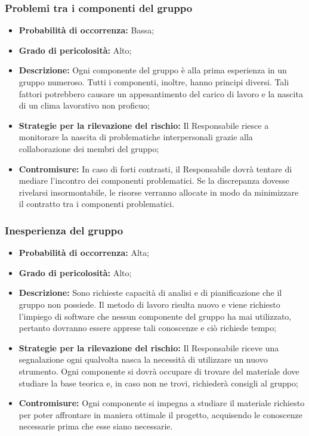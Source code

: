 		\subsubsection{Problemi tra i componenti del gruppo}
		\begin{itemize}
			\item \textbf{Probabilità di occorrenza:} Bassa; \\
			\item \textbf{Grado di pericolosità:} Alto; \\
			\item \textbf{Descrizione:} Ogni componente del gruppo è alla prima esperienza in un gruppo numeroso. Tutti i componenti, inoltre, hanno principi diversi. Tali fattori potrebbero causare un appesantimento del carico di lavoro e la nascita di un clima lavorativo non proficuo; \\
			\item \textbf{Strategie per la rilevazione del rischio:} Il Responsabile riesce a monitorare la nascita di problematiche interpersonali grazie alla collaborazione dei membri del gruppo; \\
			\item \textbf{Contromisure:} In caso di forti contrasti, il Responsabile dovrà tentare di mediare l'incontro dei componenti problematici. Se la discrepanza dovesse rivelarsi insormontabile, le risorse verranno allocate in modo da minimizzare il contratto tra i componenti problematici. \\
		\end{itemize}
		\subsubsection{Inesperienza del gruppo}
		\begin{itemize}
			\item \textbf{Probabilità di occorrenza:} Alta; \\
			\item \textbf{Grado di pericolosità:} Alto; \\
			\item \textbf{Descrizione:} Sono richieste capacità di analisi e di pianificazione che il gruppo non possiede. Il metodo di lavoro risulta nuovo e viene richiesto l'impiego di software che nessun componente del gruppo ha mai utilizzato, pertanto dovranno essere apprese tali conoscenze e ciò richiede tempo; \\
			\item \textbf{Strategie per la rilevazione del rischio:} Il Responsabile riceve una segnalazione ogni qualvolta nasca la necessità di utilizzare un nuovo strumento. Ogni componente si dovrà occupare di trovare del materiale dove studiare la base teorica e, in caso non ne trovi, richiederà consigli al gruppo; \\
			\item \textbf{Contromisure:} Ogni componente si impegna a studiare il materiale richiesto per poter affrontare in maniera ottimale il progetto, acquisendo le conoscenze necessarie prima che esse siano necessarie.  \\
		\end{itemize}
